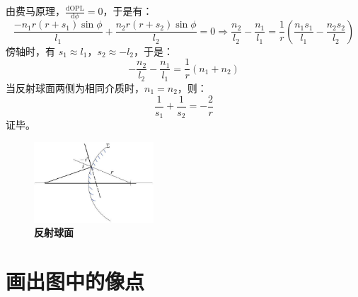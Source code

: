 \documentclass[UTF8]{report}
\theoremstyle{MyLineTheoremStyle} %
\theoremstyle{MyBlockTheoremStyle} %
\theoremstyle{MySubsubsectionStyle} %
\begin{document}
由费马原理，$\frac{\mathrm{d} \text{OPL}  }{\mathrm{d} \phi } = 0$，于是有：
\begin{equation}
\frac{-n_1r(r+s_1)\sin \phi }{l_1} + \frac{n_2r(r+s_2)\sin \phi }{l_2} = 0 
\Longrightarrow 
\frac{n_2}{l_2} - \frac{n_1}{l_1} = \frac{1}{r}\left( \frac{n_1s_1}{l_1} - \frac{n_2s_2}{l_2} \right)
\end{equation}
傍轴时，有 $s_1 \approx l_1$，$s_2 \approx -l_2$，于是：
\begin{equation}
-\frac{n_2}{l_2} - \frac{n_1}{l_1} = \frac{1}{r}(n_1 + n_2)
\end{equation}
当反射球面两侧为相同介质时，$n_1 = n_2$，则：
\begin{equation}
\frac{1}{s_1} + \frac{1}{s_2} = -\frac{2}{r}
\end{equation}
证毕。

\begin{figure}[H]\centering
    \includegraphics[width=0.4\textwidth]{assets/16fdc5948c7dc7e2b7d9c49894df116a.jpg}
    \caption{\bfseries 反射球面}\label{反射球面}
    \end{figure}

\section{画出图中的像点}
\end{document}
